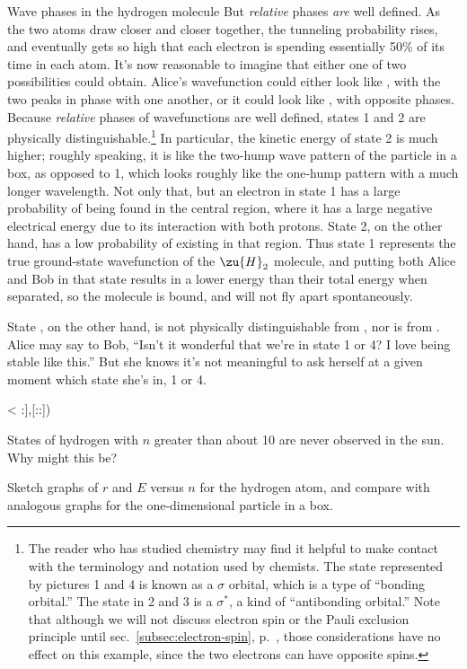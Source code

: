 \begin{eg}{Wave phases in the hydrogen molecule}
But \emph{relative} phases \emph{are} well defined. As the two atoms draw closer and closer together,
the tunneling probability rises, and eventually gets so high that each electron is spending essentially
50\% of its time in each atom. It's now reasonable to imagine that either one of two possibilities could
obtain. Alice's wavefunction could either look like , with the two peaks in
phase with one another, or it could look like , with opposite phases. Because
\emph{relative} phases of wavefunctions are well defined, states 1 and 2 are physically 
distinguishable.\footnote{The reader who has studied chemistry may find it helpful to make contact
with the terminology and notation used by chemists. The state represented by
pictures 1 and 4 is known as a
$\sigma$ orbital, which is a type of ``bonding orbital.'' The state in 2 and 3 is a $\sigma^*$, a kind of
``antibonding orbital.'' Note that although we will not discuss electron spin or the Pauli exclusion
principle until sec.~\ref{subsec:electron-spin}, p.~\pageref{subsec:electron-spin}, those considerations
have no effect on this example, since the two electrons can have opposite spins.}
In particular, the kinetic energy of state 2 is much higher; roughly speaking, it is like the two-hump
wave pattern of the particle in a box, as opposed to 1, which looks roughly like the one-hump pattern
with a much longer wavelength. Not only that, but an electron in state 1 has a large probability of being found in the
central region, where it has a large negative electrical energy due to its interaction with both protons.
State 2, on the other hand, has a low probability of existing in that region. Thus state 1 represents the
true ground-state wavefunction of the $\zu{H}_2$ molecule, and putting both Alice and Bob in that state
results in a lower energy than their total energy when separated, so the molecule is bound, and will not
fly apart spontaneously.

State , on the other hand, is not physically distinguishable from ,
nor is  from . Alice may say to Bob, ``Isn't it wonderful that
we're in state 1 or 4? I love being stable like this.'' But she knows it's not meaningful to ask herself
at a given moment which state she's in, 1 or 4.
\end{eg}


<%
:],[::])

\startdqs

\begin{dq}
States of hydrogen with $n$ greater than about 10 are
never observed in the sun. Why might this be?
\end{dq}

\begin{dq}
Sketch graphs of $r$ and $E$ versus $n$ for the hydrogen atom,
and compare with analogous graphs for the one-dimensional particle in a box.
\end{dq}
